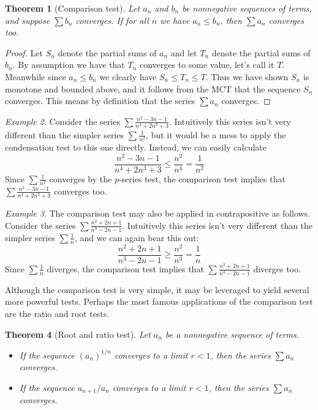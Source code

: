 \documentclass[11pt,oneside]{amsbook}
\theoremstyle{definition}
\theoremstyle{plain}
\newtheorem{thm}{Theorem}[section]
\theoremstyle{definition}
\theoremstyle{remark}
\newtheorem{example}[thm]{Example}
\numberwithin{equation}{section}
\numberwithin{figure}{section}
\begin{document}
\begin{thm}[Comparison test]
  Let $a_n$ and $b_n$ be nonnegative sequences of terms, and suppose $\sum b_n$ converges. If for all $n$ we have $a_n\leq b_n$, then $\sum a_n$ converges too.
\end{thm}

\begin{proof}
  Let $S_n$ denote the partial sums of $a_n$ and let $T_n$ denote the partial sums of $b_n$. By assumption we have that $T_n$ converges to some value, let's call it $T$. Meanwhile since $a_n\leq b_n$ we clearly have $S_n\leq T_n\leq T$. Thus we have shown $S_n$ is monotone and bounded above, and it follows from the MCT that the sequence $S_n$ converges. This means by definition that the series $\sum a_n$ converges.
\end{proof}

\begin{example}
  Consider the series $\sum\frac{n^2-3n-1}{n^4+2n^3+3}$. Intuitively this series isn't very different than the simpler series $\sum\frac{1}{n^2}$, but it would be a mess to apply the condensation test to this one directly. Instead, we can easily calculate
  \[\frac{n^2-3n-1}{n^4+2n^3+3}\leq\frac{n^2}{n^4}=\frac{1}{n^2}
  \]
  Since $\sum\frac{1}{n^2}$ converges by the $p$-series test, the comparison test implies that $\sum\frac{n^2-3n-1}{n^4+2n^3+3}$ converges too.
\end{example}

\begin{example}
  The comparison test may also be applied in contrapositive as follows. Consider the series $\sum\frac{n^2+2n+1}{n^3-2n-1}$. Intuitively this series isn't very different than the simpler series $\sum\frac1n$, and we can again bear this out:
  \[\frac{n^2+2n+1}{n^3-2n-1}\geq\frac{n^2}{n^3}=\frac1n
  \]
  Since $\sum\frac1n$ diverges, the comparison test implies that $\sum\frac{n^2+2n+1}{n^3-2n-1}$ diverges too.
\end{example}

Although the comparison test is very simple, it may be leveraged to yield several more powerful tests. Perhaps the most famous applications of the comparison test are the ratio and root tests.

\begin{thm}[Root and ratio test]
  Let $a_n$ be a nonnegative sequence of terms.
  \begin{itemize}
  \item If the sequence $(a_n)^{1/n}$ converges to a limit $r<1$, then the series $\sum a_n$ converges.
  \item If the sequence $a_{n+1}/a_n$ converges to a limit $r<1$, then the series $\sum a_n$ converges.
  \end{itemize}
\end{thm}
\end{document}
